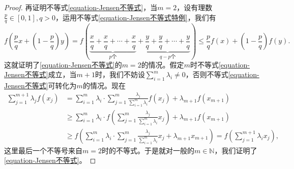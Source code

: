 \documentclass[../../main.tex]{subfiles}%
\begin{document}
\begin{proof}
再证明不等式\eqref{equation-Jensen不等式}，当\(m = 2\)，设有理数\(\frac{p}{q}\in[0,1],q>0\)，运用不等式\eqref{equation-Jensen不等式特例}，我们有
\[
f\left(\frac{p}{q}x+\left(1-\frac{p}{q}\right)y\right)=f\left(\underbrace{\frac{x}{q}+\frac{x}{q}+\cdots+\frac{x}{q}}_{p个}+\underbrace{\frac{y}{q}+\frac{y}{q}+\cdots+\frac{y}{q}}_{q - p个}\right)\leqslant\frac{p}{q}f(x)+\left(1-\frac{p}{q}\right)f(y).
\]
这就证明了\eqref{equation-Jensen不等式}的\(m = 2\)的情况。假定\(m\)时不等式\eqref{equation-Jensen不等式}成立，当\(m + 1\)时，我们不妨设\(\sum_{i = 1}^{m}\lambda_i\neq0\)，否则不等式\eqref{equation-Jensen不等式}可转化为$m$的情况。现在
\begin{align*}
\sum_{j = 1}^{m + 1}\lambda_jf(x_j)&=\sum_{i = 1}^{m}\lambda_i\cdot\sum_{j = 1}^{m}\frac{\lambda_j}{\sum\limits_{i = 1}^{m}\lambda_i}f(x_j)+\lambda_{m+1}f(x_{m + 1})\\
&\geqslant\sum_{i = 1}^{m}\lambda_i\cdot f\left(\sum_{j = 1}^{m}\frac{\lambda_j}{\sum\limits_{i = 1}^{m}\lambda_i}x_j\right)+\lambda_{m+1}f(x_{m + 1})\\
&\geqslant f\left(\sum_{i = 1}^{m}\lambda_i\cdot\sum_{j = 1}^{m}\frac{\lambda_j}{\sum\limits_{i = 1}^{m}\lambda_i}x_j+\lambda_{m+1}x_{m + 1}\right)=f\left(\sum\limits_{j = 1}^{m + 1}\lambda_ix_j\right),
\end{align*}
这里最后一个不等号来自\(m = 2\)时的不等式。于是就对一般的\(m\in\mathbb{N}\)，我们证明了\eqref{equation-Jensen不等式}。
\end{proof}
\end{document}
